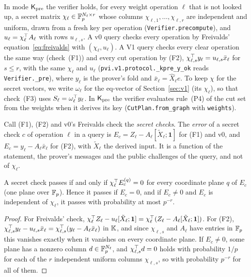  In mode $\mathsf{K}_{\mathrm{pre}}$ the verifier holds, for every weight operation $\ell$ that is not
looked up, a secret matrix $\chi_\ell\in\mathbb{F}_p^{N_\ell\times r}$ whose columns
$\chi_{\ell,1},\dots,\chi_{\ell,r}$ are independent and uniform, drawn from a fresh key per
operation (\texttt{Verifier.precompute}), and $u_\ell=\chi_\ell^\top A_\ell$ with rows $u_{\ell,s}$.
A v0 query checks every operation by Freivalds' equation~\eqref{eq:freivalds} with
$(\chi_\ell,u_\ell)$. A V1 query checks every clear operation the same way (check~(F1)) and every
cut operation by (F2), $\chi_{\ell,s}^\top y_\ell=u_{\ell,s}\bar x_\ell$ for $s\le r$, with the same
$\chi_\ell$ and $u_\ell$ (\texttt{pvi.v1.protocol.\_kpre\_y\_ok} reads \texttt{Verifier.\_pre}), where
$y_\ell$ is the prover's fold and $\bar x_\ell=\hat X_\ell e$. To keep $\chi$ for the secret
vectors, we write $\omega_\ell$ for the eq-vector of Section~\ref{sec:v1} (its $\chi_\ell$), so that
check~(F3) uses $S_\ell=\omega_\ell^\top y_\ell$. In $\mathsf{K}_{\mathrm{pre}}$ the verifier evaluates rule~(P4) of the
cut set from the weights when it derives its key (\texttt{CutPlan.from\_graph} with \texttt{weights}).

 Call (F1), (F2) and v0's Freivalds check the \emph{secret
checks}. The \emph{error} of a secret check $c$ of operation $\ell$ in a query is
$E_c=Z_\ell-A_\ell[\tilde X_\ell;\mathbf 1]$ for (F1) and v0, and $E_c=y_\ell-A_\ell\bar x_\ell$ for
(F2), with $\tilde X_\ell$ the derived input. It is a function of the statement, the prover's
messages and the public challenges of the query, and not of $\chi_\ell$.

\begin{lemma}
\label{lem:secret-check}
A secret check passes if and only if $\chi_\ell^\top E^{(q)}_c=0$ for every coordinate plane $q$ of
$E_c$ (one plane over $\mathbb{F}_p$). Hence it passes if $E_c=0$, and if $E_c\neq0$ and $E_c$ is independent
of $\chi_\ell$, it passes with probability at most $p^{-r}$.
\end{lemma}

\begin{proof}
For Freivalds' check, $\chi_\ell^\top Z_\ell-u_\ell[\tilde X_\ell;\mathbf 1]
=\chi_\ell^\top(Z_\ell-A_\ell[\tilde X_\ell;\mathbf 1])$. For (F2),
$\chi_{\ell,s}^\top y_\ell-u_{\ell,s}\bar x_\ell=\chi_{\ell,s}^\top(y_\ell-A_\ell\bar x_\ell)$ in
$\mathbb{K}$, and since $\chi_{\ell,s}$ and $A_\ell$ have entries in $\mathbb{F}_p$ this vanishes exactly when it
vanishes on every coordinate plane. If $E_c\neq0$, some plane has a nonzero column $d\in\mathbb{F}_p^{N_\ell}$,
and $\chi_{\ell,s}^\top d=0$ holds with probability $1/p$ for each of the $r$ independent uniform
columns $\chi_{\ell,s}$, so with probability $p^{-r}$ for all of them.
\end{proof}

